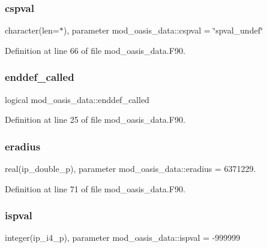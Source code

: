 \subsubsection{\texorpdfstring{cspval}{cspval}}
{\footnotesize\ttfamily character(len=$\ast$), parameter mod\+\_\+oasis\+\_\+data\+::cspval = \char`\"{}spval\+\_\+undef\char`\"{}}



Definition at line 66 of file mod\+\_\+oasis\+\_\+data.\+F90.

\mbox{\label{namespacemod__oasis__data_a5341a9152ef540667f7fcaa4f04c6399}} 
\subsubsection{\texorpdfstring{enddef\+\_\+called}{enddef\_called}}
{\footnotesize\ttfamily logical mod\+\_\+oasis\+\_\+data\+::enddef\+\_\+called}



Definition at line 25 of file mod\+\_\+oasis\+\_\+data.\+F90.

\mbox{\label{namespacemod__oasis__data_a7f361db125e5554d0427e964b698f10c}} 
\subsubsection{\texorpdfstring{eradius}{eradius}}
{\footnotesize\ttfamily real(ip\+\_\+double\+\_\+p), parameter mod\+\_\+oasis\+\_\+data\+::eradius = 6371229.}



Definition at line 71 of file mod\+\_\+oasis\+\_\+data.\+F90.

\mbox{\label{namespacemod__oasis__data_a66bd35eca1454b6d8c8ac0449f2ca475}} 
\subsubsection{\texorpdfstring{ispval}{ispval}}
{\footnotesize\ttfamily integer(ip\+\_\+i4\+\_\+p), parameter mod\+\_\+oasis\+\_\+data\+::ispval = -\/999999}




